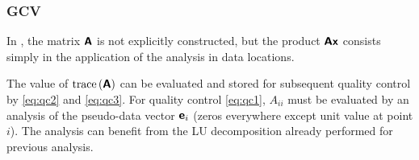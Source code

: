 \subsubsection{\diva GCV}

In \diva, the matrix $\mbox{\boldmath $ \protect\mathsf{A} $}$ is not explicitly constructed, but the product $\mbox{\boldmath $ \protect\mathsf{A} $} \mbox{\boldmath $ \protect\mathsf{x} $}$ consists simply in the application of the analysis in data locations.

The value of $\mathrm{trace}\left( \mbox{\boldmath $ \protect\mathsf{A} $} \right)$ can be evaluated and stored for subsequent quality control by \eqref{eq:qc2} and \eqref{eq:qc3}.
For quality control \eqref{eq:qc1}, $A_{ii}$ must be evaluated by an analysis of the pseudo-data vector $\mbox{\boldmath $ \protect\mathsf{e} $}_i$ (zeros everywhere except unit value at point $i$). The analysis can benefit from the \textsf{LU} decomposition already performed for previous analysis.


